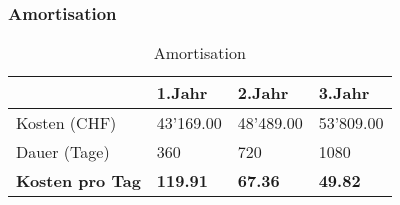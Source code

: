 \subsubsection{Amortisation}
\begin{table}[H]
\centering
\begin{tabular}{p{4cm}p{4cm}p{4cm}p{4cm}}
\hline
\rowcolor{heading} & \textbf{1.Jahr} & \textbf{2.Jahr} & \textbf{3.Jahr}\\\hline
Kosten (CHF) & 43'169.00 & 48'489.00 & 53'809.00 \\\hline
Dauer (Tage) & 360 & 720 & 1080 \\\hline
\rowcolor{subheading}\textbf{Kosten pro Tag} & \textbf{119.91} & \textbf{67.36} & \textbf{49.82} \\\hline
\end{tabular}
\caption{Amortisation}
\end{table}